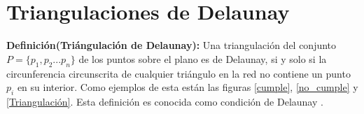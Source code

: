 \documentclass[12pt]{report}
\begin{document}

\section{Triangulaciones de Delaunay}
\textbf{Definición(Triángulación de Delaunay):} Una triangulación del conjunto $P=\{p_1,p_2 ... p_n\}$ de los puntos sobre el plano es de Delaunay, si y solo si la circunferencia circunscrita de cualquier triángulo en la red no contiene un punto $p_i$ en su interior. Como ejemplos de esta están las figuras \ref{cumple}, \ref{no_cumple} y  \ref{Triangulación}. Esta definición es conocida como condición de Delaunay \cite{26,27,28}.\\    
\end{document}
